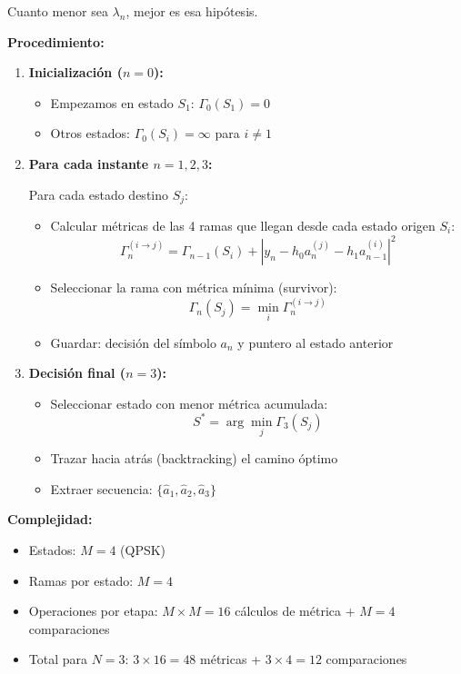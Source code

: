 \documentclass[11pt,a4paper]{article}
\begin{document}
Cuanto menor sea $\lambda_n$, mejor es esa hip\'otesis.

\textbf{Procedimiento:}

\begin{enumerate}
    \item \textbf{Inicializaci\'on ($n=0$):}
    \begin{itemize}
        \item Empezamos en estado $S_1$: $\Gamma_0(S_1) = 0$
        \item Otros estados: $\Gamma_0(S_i) = \infty$ para $i \neq 1$
    \end{itemize}
    
    \item \textbf{Para cada instante $n = 1, 2, 3$:}
    
    Para cada estado destino $S_j$:
    \begin{itemize}
        \item Calcular m\'etricas de las 4 ramas que llegan desde cada estado origen $S_i$:
        \[
        \Gamma_n^{(i \to j)} = \Gamma_{n-1}(S_i) + |y_n - h_0 a_n^{(j)} - h_1 a_{n-1}^{(i)}|^2
        \]
        
        \item Seleccionar la rama con m\'etrica m\'inima (survivor):
        \[
        \Gamma_n(S_j) = \min_i \Gamma_n^{(i \to j)}
        \]
        
        \item Guardar: decisi\'on del s\'imbolo $a_n$ y puntero al estado anterior
    \end{itemize}
    
    \item \textbf{Decisi\'on final ($n=3$):}
    \begin{itemize}
        \item Seleccionar estado con menor m\'etrica acumulada:
        \[
        S^* = \arg\min_{j} \Gamma_3(S_j)
        \]
        
        \item Trazar hacia atr\'as (backtracking) el camino \'optimo
        
        \item Extraer secuencia: $\{\hat{a}_1, \hat{a}_2, \hat{a}_3\}$
    \end{itemize}
\end{enumerate}

\textbf{Complejidad:}

\begin{itemize}
    \item Estados: $M = 4$ (QPSK)
    \item Ramas por estado: $M = 4$
    \item Operaciones por etapa: $M \times M = 16$ c\'alculos de m\'etrica + $M = 4$ comparaciones
    \item Total para $N=3$: $3 \times 16 = 48$ m\'etricas + $3 \times 4 = 12$ comparaciones
\end{itemize}
\end{document}
